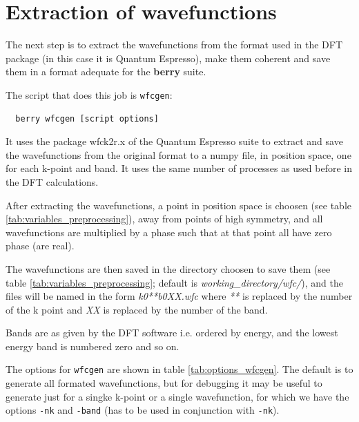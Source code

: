 \documentclass[a4paper,12pt]{report}
\begin{document}
\section{Extraction of wavefunctions}

The next step is to extract the wavefunctions from the format used in the DFT package
(in this case it is {\sc Quantum Espresso}),
make them coherent and save them in a format adequate for the \textbf{berry} suite.

The script that does this job is \texttt{wfcgen}:
\begin{verbatim}
  berry wfcgen [script options]
\end{verbatim}

It uses the package wfck2r.x of the {\sc Quantum Espresso} suite to extract and save the wavefunctions
from the original format to a numpy file, in position space, one for each k-point and band.
It uses the same number of processes as used before in the DFT calculations.

After extracting the wavefunctions,
 a point in position space is choosen (see table \ref{tab:variables_preprocessing}),
away from points of high symmetry, and all wavefunctions
are multiplied by a phase such that at that point all have zero phase (are real).

The wavefunctions are then saved in the directory choosen to save them
(see table \ref{tab:variables_preprocessing}; default is \emph{working\_directory/}\emph{wfc/}),
and the files will be named in the form \emph{k0**b0XX.wfc} where \emph{**} is replaced by the number of the k point
and \emph{XX} is replaced by the number of the band.

Bands are as given by the DFT software i.e. ordered by energy,
and the lowest energy band is numbered zero and so on.

The options for \texttt{wfcgen} are shown in table \ref{tab:options_wfcgen}.
The default is to generate all formated wavefunctions, but for debugging it may be useful
to generate just for a singke k-point or a single wavefunction, for which we have the options
\texttt{-nk} and \texttt{-band} (has to be used in conjunction with \texttt{-nk}).
\end{document}
